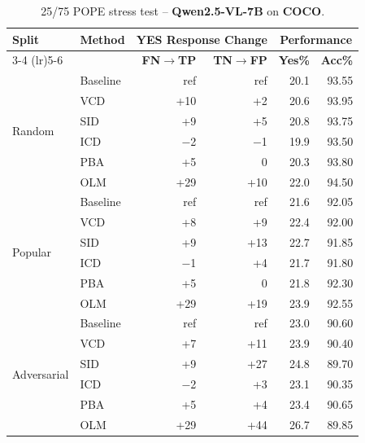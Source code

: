 \documentclass[11pt]{article}
\begin{document}
\begin{table}[ht]
\centering
\caption{25/75 POPE stress test -- \textbf{Qwen2.5-VL-7B} on \textbf{COCO}.}
\label{tab:25_75_qwen_coco}
\setlength{\tabcolsep}{6pt}
\renewcommand{\arraystretch}{1.1}
\begin{tabular}{l|l|rr|rr}
\toprule
\multirow{2}{*}{\textbf{Split}} &
\multirow{2}{*}{\textbf{Method}} &
\multicolumn{2}{c|}{\textbf{YES Response Change}} &
\multicolumn{2}{c}{\textbf{Performance}} \\
\cmidrule(lr){3-4} \cmidrule(lr){5-6}
& & \textbf{FN$\to$TP} & \textbf{TN$\to$FP} & \textbf{Yes\%} & \textbf{Acc\%} \\
\midrule

\multirow{6}{*}{Random}
& Baseline & ref   & ref  & 20.1 & 93.55 \\
& VCD      & +10   & +2   & 20.6 & 93.95 \\
& SID      & +9    & +5   & 20.8 & 93.75 \\
& ICD      & $-$2  & $-$1 & 19.9 & 93.50 \\
& PBA      & +5    & 0    & 20.3 & 93.80 \\
& OLM      & +29   & +10  & 22.0 & 94.50 \\
\midrule

\multirow{6}{*}{Popular}
& Baseline & ref   & ref  & 21.6 & 92.05 \\
& VCD      & +8    & +9   & 22.4 & 92.00 \\
& SID      & +9    & +13  & 22.7 & 91.85 \\
& ICD      & $-$1  & +4   & 21.7 & 91.80 \\
& PBA      & +5    & 0    & 21.8 & 92.30 \\
& OLM      & +29   & +19  & 23.9 & 92.55 \\
\midrule

\multirow{6}{*}{Adversarial}
& Baseline & ref   & ref  & 23.0 & 90.60 \\
& VCD      & +7    & +11  & 23.9 & 90.40 \\
& SID      & +9    & +27  & 24.8 & 89.70 \\
& ICD      & $-$2  & +3   & 23.1 & 90.35 \\
& PBA      & +5    & +4   & 23.4 & 90.65 \\
& OLM      & +29   & +44  & 26.7 & 89.85 \\
\bottomrule
\end{tabular}
\end{table}

\end{document}
